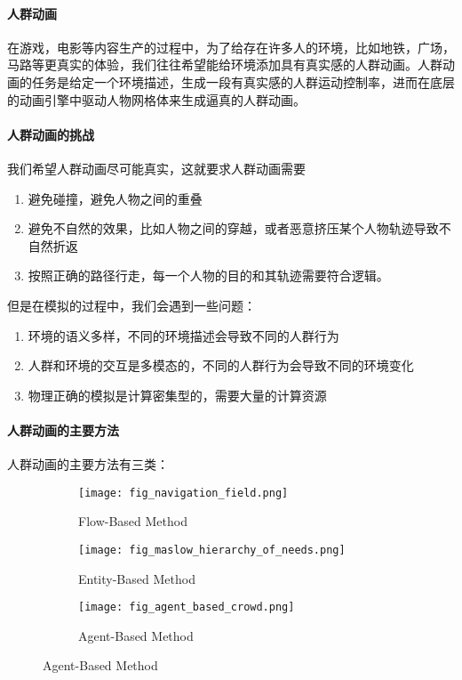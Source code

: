 \paragraph{人群动画} 在游戏，电影等内容生产的过程中，为了给存在许多人的环境，比如地铁，广场，马路等更真实的体验，我们往往希望能给环境添加具有真实感的人群动画。人群动画的任务是给定一个环境描述，生成一段有真实感的人群运动控制率，进而在底层的动画引擎中驱动人物网格体来生成逼真的人群动画。

\paragraph{人群动画的挑战} 我们希望人群动画尽可能真实，这就要求人群动画需要

\begin{enumerate}
    \item 避免碰撞，避免人物之间的重叠
    \item 避免不自然的效果，比如人物之间的穿越，或者恶意挤压某个人物轨迹导致不自然折返
    \item 按照正确的路径行走，每一个人物的目的和其轨迹需要符合逻辑。
\end{enumerate}

但是在模拟的过程中，我们会遇到一些问题：

\begin{enumerate}
    \item 环境的语义多样，不同的环境描述会导致不同的人群行为
    \item 人群和环境的交互是多模态的，不同的人群行为会导致不同的环境变化
    \item 物理正确的模拟是计算密集型的，需要大量的计算资源
\end{enumerate}

\paragraph{人群动画的主要方法} 人群动画的主要方法有三类：

\begin{figure}
    \centering
        \begin{subfigure}{0.3\linewidth}
            \texttt{[image: fig\_navigation\_field.png]}
            \caption{Flow-Based Method}
            \label{fig:flow_based_method}
        \end{subfigure}
        \begin{subfigure}{0.3\linewidth}
            \texttt{[image: fig\_maslow\_hierarchy\_of\_needs.png]}
            \caption{Entity-Based Method}
            \label{fig:entity_based_method}
        \end{subfigure}
        \begin{subfigure}{0.3\linewidth}
            \texttt{[image: fig\_agent\_based\_crowd.png]}
            \caption{Agent-Based Method}
            \label{fig:agent_based_method}
        \end{subfigure}
\end{figure}

